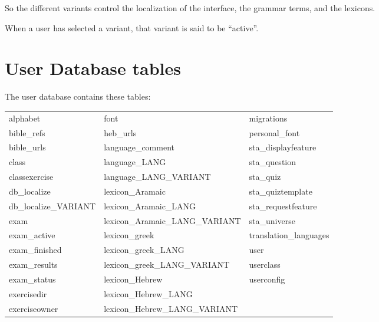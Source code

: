 \documentclass[11pt,oneside,a4paper]{memoir}
\begin{document}
So the different variants control the localization of the interface, the grammar terms, and the
lexicons.

When a user has selected a variant, that variant is said to be ``active''.

\section{User Database tables}


The user database contains these tables:

\begin{center}
\begin{tabu}{l@{\hspace{1cm}}l@{\hspace{1cm}}l}
alphabet              & font                            & migrations             \\
bible\_refs           & heb\_urls                       & personal\_font         \\
bible\_urls           & language\_comment               & sta\_displayfeature    \\
class                 & language\_LANG                  & sta\_question          \\
classexercise         & language\_LANG\_VARIANT         & sta\_quiz              \\
db\_localize          & lexicon\_Aramaic                & sta\_quiztemplate      \\
db\_localize\_VARIANT & lexicon\_Aramaic\_LANG          & sta\_requestfeature    \\
exam                  & lexicon\_Aramaic\_LANG\_VARIANT & sta\_universe          \\ 
exam\_active          & lexicon\_greek                  & translation\_languages \\ 
exam\_finished        & lexicon\_greek\_LANG            & user                   \\ 
exam\_results         & lexicon\_greek\_LANG\_VARIANT   & userclass              \\ 
exam\_status          & lexicon\_Hebrew                 & userconfig             \\ 
exercisedir           & lexicon\_Hebrew\_LANG           &                        \\ 
exerciseowner         & lexicon\_Hebrew\_LANG\_VARIANT  &                        \\ 
\end{tabu}
\end{center}
\end{document}
